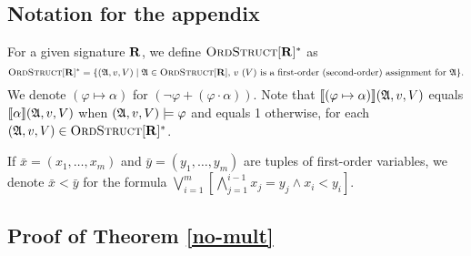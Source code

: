 
\subsection{Notation for the appendix}

For a given signature $\mathbf{R}$, we define $\text{\sc OrdStruct}[\mathbf{R}]^*$ as $$\text{\sc OrdStruct}[\mathbf{R}]^* = \{(\mathfrak{A},v,V) \mid \mathfrak{A}\in\text{\sc OrdStruct}[\mathbf{R}]\text{, $v$ ($V$) is a first-order (second-order) assignment for $\mathfrak{A}$}  \}.$$
We denote $(\varphi \mapsto \alpha)$ for $(\neg\varphi + (\varphi\cdot\alpha))$. Note that ${\llbracket{}{(\varphi \mapsto \alpha)}\rrbracket}(\mathfrak{A},v,V)$ equals ${\llbracket{}{\alpha}\rrbracket}(\mathfrak{A},v,V)$ when $(\mathfrak{A},v,V)\models\varphi$ and equals 1 otherwise, for each $(\mathfrak{A},v,V) \in \text{\sc OrdStruct}[\mathbf{R}]^*$.

If $\bar{x} = (x_1,\ldots,x_m)$ and $\bar{y} = (y_1,\ldots,y_m)$ are tuples of first-order variables, we denote $\bar{x} < \bar{y}$ for the formula $\bigvee_{i = 1}^m[\bigwedge_{j = 1}^{i-1}x_j = y_j \wedge x_i < y_i]$.

\subsection{Proof of Theorem \ref{no-mult}}

